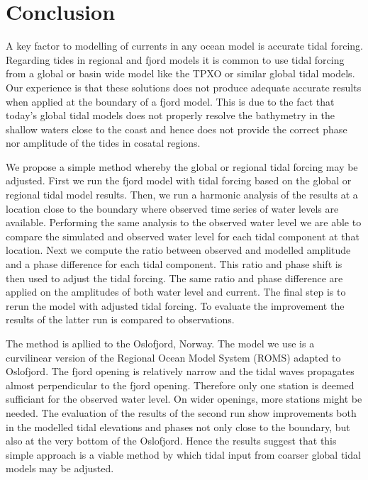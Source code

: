 \section{Conclusion}

A key factor to modelling of currents in any ocean model is accurate tidal forcing. Regarding tides in regional and fjord models it is common to use tidal forcing from a global or basin wide model like the TPXO or similar global tidal models. Our experience is that these solutions does not produce adequate accurate results when applied at the boundary of a fjord model. This is due to the fact that today's global tidal models does not properly resolve the bathymetry in the shallow waters close to the coast and hence does not provide the correct phase nor amplitude of the tides in cosatal regions. 

We propose a simple method whereby the global or regional tidal forcing may be adjusted. First we run the fjord model with tidal forcing based on the global or regional tidal model results. Then, we run a harmonic analysis of the results at a location close to the boundary where observed time series of water levels are available. Performing the same analysis to the observed water level we are able to compare the simulated and observed water level for each tidal component at that location. Next we compute the ratio between observed and modelled amplitude and a phase difference for each tidal component. This ratio and phase shift is then used to adjust the tidal forcing. The same ratio and phase difference are applied on the amplitudes of both water level and current. The final step is to rerun the model with adjusted tidal forcing. To evaluate the improvement the results of the latter run is compared to observations.

The method is apllied to the Oslofjord, Norway. The model we use is a curvilinear version of the Regional Ocean Model System (ROMS) adapted to Oslofjord. The fjord opening is relatively narrow and the tidal waves propagates almost perpendicular to the fjord opening. Therefore only one station is deemed sufficiant for the observed water level. On wider openings, more stations might be needed. The evaluation of the results of the second run show improvements both in the modelled tidal elevations and phases not only close to the boundary, but also at the very bottom of the Oslofjord. Hence the results suggest that this simple approach is a viable method by which tidal input from coarser global tidal models may be adjusted. 

